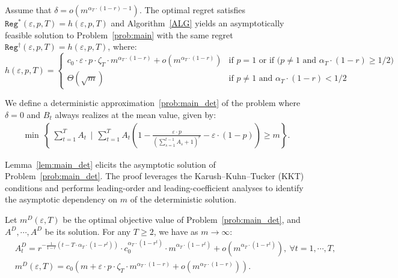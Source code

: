 \documentclass[blindrev]{informs3noheader}
\begin{document}
\begin{theorem}\label{thm:main}
Assume that $\delta = o\left(m^{\alpha_T\cdot(1-r)-1}\right)$. The optimal regret satisfies $\texttt{Reg}^*(\varepsilon, p,T)=h(\varepsilon, p,T)$ and Algorithm~\ref{ALG} yields an asymptotically feasible solution to Problem~\eqref{prob:main} with the same regret  $\texttt{Reg}^\dagger(\varepsilon, p,T)=h(\varepsilon, p,T)$, where:
$$h(\varepsilon, p,T)=\begin{cases}
    c_0\cdot\varepsilon\cdot p\cdot\zeta_T\cdot m^{\alpha_T\cdot(1-r)}+o\left(m^{\alpha_T\cdot(1-r)}\right)&\text{if $p=1$ or if ($p\neq1$ and $\alpha_T\cdot(1-r)\geq1/2$)}\\
    \Theta(\sqrt m)&\text{if $p\neq1$ and $\alpha_T\cdot(1-r)<1/2$}
\end{cases}$$
\end{theorem}


We define a deterministic approximation~\eqref{prob:main_det} of the problem where $\delta=0$ and $B_t$ always realizes at the mean value, given by:
\begin{align}\label{prob:main_det}\tag{$\calP^D$}
\min\ \left\{\ \sum_{t=1}^T A_t \ \ \bigg|\ \ \sum_{t=1}^TA_t \left(1- \frac{\varepsilon\cdot p}{\left(\sum_{s=1}^{t-1} A_s +1\right)^r}-\varepsilon\cdot(1-p)\right)\geq m\right\}.
\end{align}

Lemma~\ref{lem:main_det} elicits the asymptotic solution of Problem~\eqref{prob:main_det}. The proof leverages the Karush–Kuhn–Tucker (KKT) conditions and performs leading-order and leading-coefficient analyses to identify the asymptotic dependency on $m$ of the deterministic solution.

\begin{lemma}\label{lem:main_det}
Let $m^D(\varepsilon, T)$ be the optimal objective value of Problem~\eqref{prob:main_det}, and $A^D,\cdots, A^D$ be its solution. For any $T\geq 2$, we have as $m \to \infty$: 
\begin{align}
   & A^D_t = r^{-\frac{1}{1-r}\left(t-T\cdot\alpha_T\cdot(1-r^t)\right)}\cdot c_0^{\alpha_T\cdot(1-r^t)}\cdot m^{\alpha_T\cdot(1-r^t)}+ o\left(m^{\alpha_T\cdot(1-r^t)}\right),\ \forall t=1,\cdots,T,\label{eq:deterministic_decision}\\
   &m^D(\varepsilon, T) = c_0\left( m+\varepsilon\cdot p\cdot \zeta_T \cdot m^{\alpha_T\cdot(1-r)} +  o\left(m^{\alpha_T\cdot(1-r)}\right)\right).\label{eq:deterministic_solution}
\end{align}
\end{lemma}
\end{document}
